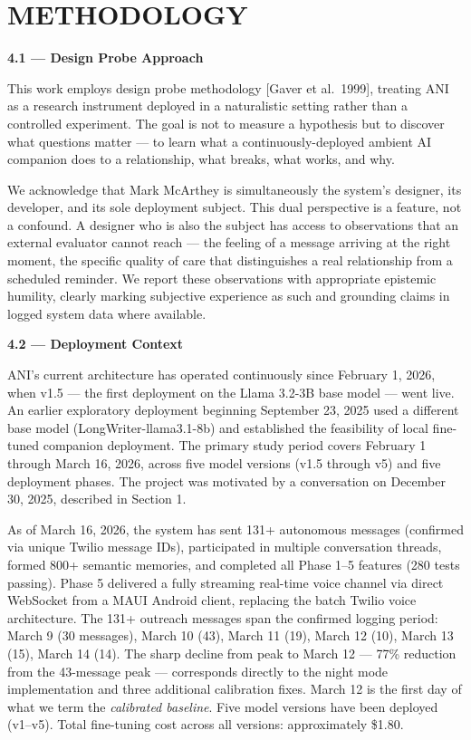 \documentclass[12pt]{article}
\begin{document}
%
\section{METHODOLOGY}\label{methodology}

\textbf{4.1 --- Design Probe Approach}

This work employs design probe methodology {[}Gaver et al.~1999{]},
treating ANI as a research instrument deployed in a naturalistic setting
rather than a controlled experiment. The goal is not to measure a
hypothesis but to discover what questions matter --- to learn what a
continuously-deployed ambient AI companion does to a relationship, what
breaks, what works, and why.

We acknowledge that Mark McArthey is simultaneously the system's
designer, its developer, and its sole deployment subject. This dual
perspective is a feature, not a confound. A designer who is also the
subject has access to observations that an external evaluator cannot
reach --- the feeling of a message arriving at the right moment, the
specific quality of care that distinguishes a real relationship from a
scheduled reminder. We report these observations with appropriate
epistemic humility, clearly marking subjective experience as such and
grounding claims in logged system data where available.

\textbf{4.2 --- Deployment Context}

ANI's current architecture has operated continuously since February 1,
2026, when v1.5 --- the first deployment on the Llama 3.2-3B base model
--- went live. An earlier exploratory deployment beginning September 23,
2025 used a different base model (LongWriter-llama3.1-8b) and
established the feasibility of local fine-tuned companion deployment.
The primary study period covers February 1 through March 16, 2026,
across five model versions (v1.5 through v5) and five deployment phases.
The project was motivated by a conversation on December 30, 2025,
described in Section 1.

As of March 16, 2026, the system has sent 131+ autonomous messages
(confirmed via unique Twilio message IDs), participated in multiple
conversation threads, formed 800+ semantic memories, and completed all
Phase 1--5 features (280 tests passing). Phase 5 delivered a fully
streaming real-time voice channel via direct WebSocket from a MAUI
Android client, replacing the batch Twilio voice architecture. The 131+
outreach messages span the confirmed logging period: March 9 (30
messages), March 10 (43), March 11 (19), March 12 (10), March 13 (15),
March 14 (14). The sharp decline from peak to March 12 --- 77\%
reduction from the 43-message peak --- corresponds directly to the night
mode implementation and three additional calibration fixes. March 12 is
the first day of what we term the \emph{calibrated baseline}. Five model
versions have been deployed (v1--v5). Total fine-tuning cost across all
versions: approximately \$1.80.
\end{document}
